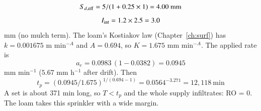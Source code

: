 \sol {}\ans \[S_{d,\rm eff}=5/(1+0.25\times1)=4.00\ \text{mm}\]
\[I_{\rm int}=1.2\times2.5=3.0\] mm (no mulch term). The loam's Kostiakov law (Chapter~\ref{ch:surf}) has $k=0.001675$ m min$^{-A}$ and $A=0.694$, so $K=1.675$ mm min$^{-A}$. The applied rate is \[a_e=0.0983\,(1-0.0382)=0.0945\] mm min$^{-1}$ ($5.67$ mm h$^{-1}$ after drift). Then \[t_p=(0.0945/1.675)^{1/(0.694-1)}=0.0564^{-3.271}=12{,}118\ \text{min}\]
A set is about 371 min long, so $T<t_p$ and the whole supply infiltrates: RO = 0. The loam takes this sprinkler with a wide margin. \finans


